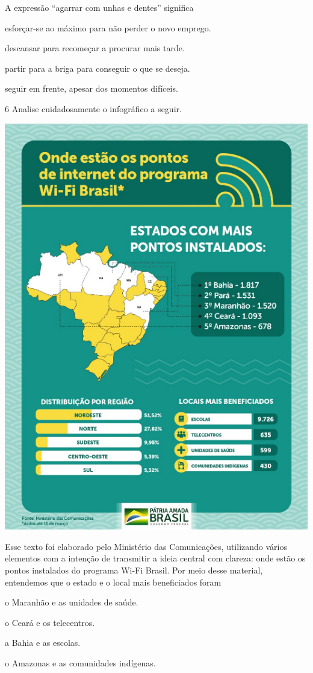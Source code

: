 \pagebreak
A expressão ``agarrar com unhas e dentes'' significa

\begin{escolha}
\item esforçar-se ao máximo para não perder o novo emprego.

\item descansar para recomeçar a procurar mais tarde.

\item partir para a briga para conseguir o que se deseja.

\item seguir em frente, apesar dos momentos difíceis.
\end{escolha}


\num{6} Analise cuidadosamente o infográfico a seguir.

\begin{center}
\includegraphics[width=.7\textwidth]{./media/simulados/image7.png}
\end{center}

Esse texto foi elaborado pelo Ministério das Comunicações, utilizando
vários elementos com a intenção de transmitir a ideia central com
clareza: onde estão os pontos instalados do programa Wi-Fi Brasil. Por
meio desse material, entendemos que o estado e o local mais beneficiados
foram

\begin{escolha}
\item o Maranhão e as unidades de saúde.

\item o Ceará e os telecentros.

\item a Bahia e as escolas.

\item o Amazonas e as comunidades indígenas.
\end{escolha}


